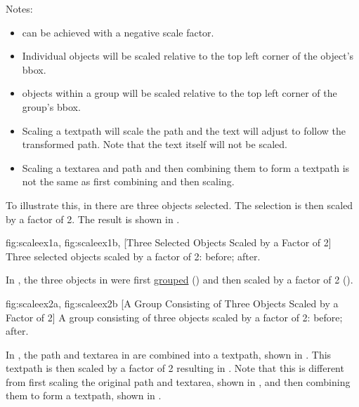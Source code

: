 Notes:
\begin{itemize}
\item {} can be
achieved with a negative scale factor.

\item Individual \glspl*{object} will be
scaled relative to the top left corner of the
object's \gls{bbox}.

\item \Glspl*{object} within a
\gls{group} will be scaled relative to the top left corner
of the group's \gls*{bbox}.

\item Scaling a \gls{textpath} will scale the path and the text
will adjust to follow the transformed path. Note that the text
itself will not be scaled.

\item Scaling a \gls*{textarea} and \gls*{path} and then combining
them to form a \gls*{textpath} is not the same as first combining
and then scaling.
\end{itemize}

To illustrate this, in  there are three
\glspl*{object} selected.
The selection is then scaled by a factor of 2.
The result is shown in .

{
 {fig:scaleex1a}{}{},
 {fig:scaleex1b}{}{},
}
[Three Selected Objects Scaled by a Factor of 2]
{Three selected objects scaled by a factor of 2:
 before;
 after.}

In , the three objects in
 were first
\hyperref[sec:grouping]{grouped} ()
and then scaled by a factor of 2 ().

{
 {fig:scaleex2a}{}{},
 {fig:scaleex2b}{}{}
}
[A Group Consisting of Three Objects Scaled by a Factor of 2]
{A group consisting of three objects scaled by a factor of 2:
 before;
 after.}

In , the \gls*{path} and
\gls*{textarea} in  are combined
into a \gls*{textpath}, shown in
. This \gls*{textpath} is then
scaled by a factor of 2 resulting in
. Note that this is different
from first scaling the original \gls*{path} and \gls*{textarea},
shown in , and then combining
them to form a \gls*{textpath}, shown in
.

